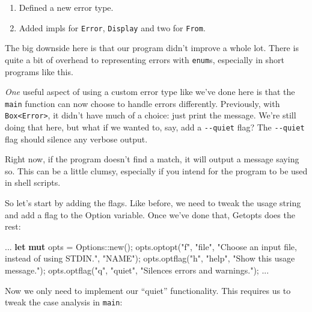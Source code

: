 \documentclass[a4paper,]{book}
\newenvironment{Shaded}{\begin{snugshade}}{\end{snugshade}}
\newcommand{\KeywordTok}[1]{\textcolor[rgb]{0.13,0.29,0.53}{\textbf{{#1}}}}
\newcommand{\StringTok}[1]{\textcolor[rgb]{0.31,0.60,0.02}{{#1}}}
\newcommand{\NormalTok}[1]{{#1}}
\providecommand{\tightlist}{%
  \setlength{\itemsep}{0pt}\setlength{\parskip}{0pt}}
\begin{document}
\begin{enumerate}
\def\labelenumi{\arabic{enumi}.}
\tightlist
\item
  Defined a new error type.
\item
  Added impls for \texttt{Error}, \texttt{Display} and two for
  \texttt{From}.
\end{enumerate}

The big downside here is that our program didn't improve a whole lot.
There is quite a bit of overhead to representing errors with
\texttt{enum}s, especially in short programs like this.

\emph{One} useful aspect of using a custom error type like we've done
here is that the \texttt{main} function can now choose to handle errors
differently. Previously, with
\texttt{Box\textless{}Error\textgreater{}}, it didn't have much of a
choice: just print the message. We're still doing that here, but what if
we wanted to, say, add a \texttt{-\/-quiet} flag? The \texttt{-\/-quiet}
flag should silence any verbose output.

Right now, if the program doesn't find a match, it will output a message
saying so. This can be a little clumsy, especially if you intend for the
program to be used in shell scripts.

So let's start by adding the flags. Like before, we need to tweak the
usage string and add a flag to the Option variable. Once we've done
that, Getopts does the rest:

\begin{Shaded}
\begin{Highlighting}[]
\NormalTok{...}
    \KeywordTok{let} \KeywordTok{mut} \NormalTok{opts = Options::new();}
    \NormalTok{opts.optopt(}\StringTok{"f"}\NormalTok{, }\StringTok{"file"}\NormalTok{, }\StringTok{"Choose an input file, instead of using STDIN."}\NormalTok{, }\StringTok{"NAME"}\NormalTok{);}
    \NormalTok{opts.optflag(}\StringTok{"h"}\NormalTok{, }\StringTok{"help"}\NormalTok{, }\StringTok{"Show this usage message."}\NormalTok{);}
    \NormalTok{opts.optflag(}\StringTok{"q"}\NormalTok{, }\StringTok{"quiet"}\NormalTok{, }\StringTok{"Silences errors and warnings."}\NormalTok{);}
\NormalTok{...}
\end{Highlighting}
\end{Shaded}

Now we only need to implement our ``quiet'' functionality. This requires
us to tweak the case analysis in \texttt{main}:
\end{document}
